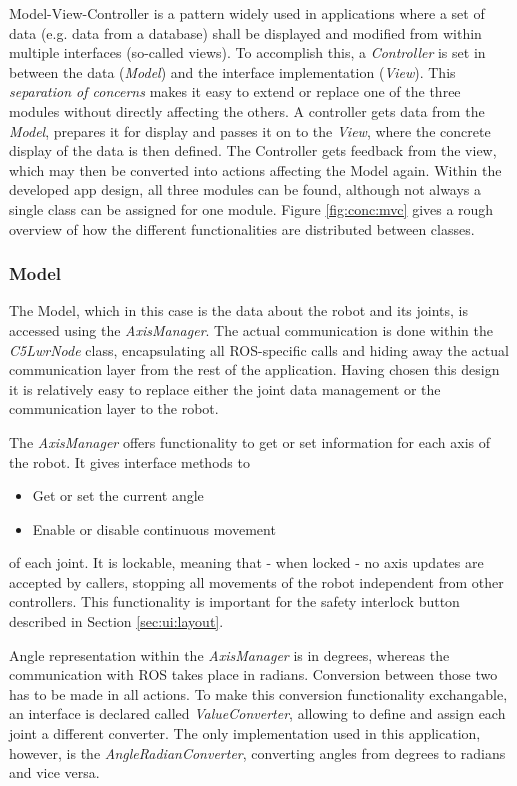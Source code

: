 Model-View-Controller is a pattern widely used in applications where a set of data (e.g. data from a database) shall be displayed and modified from within multiple interfaces (so-called views)\cite{Eilebrecht2013}. To accomplish this, a \textit{Controller} is set in between the data (\textit{Model}) and the interface implementation (\textit{View}). This \textit{separation of concerns} makes it easy to extend or replace one of the three modules without directly affecting the others. A controller gets data from the \textit{Model}, prepares it for display and passes it on to the \textit{View}, where the concrete display of the data is then defined. The Controller gets feedback from the view, which may then be converted into actions affecting the Model again. Within the developed app design, all three modules can be found, although not always a single class can be assigned for one module. Figure \ref{fig:conc:mvc} gives a rough overview of how the different functionalities are distributed between classes.

\subsubsection{Model}

The Model, which in this case is the data about the robot and its joints, is accessed using the \textit{AxisManager}. The actual communication is done within the \textit{C5LwrNode} class, encapsulating all ROS-specific calls and hiding away the actual communication layer from the rest of the application. Having chosen this design it is relatively easy to replace either the joint data management or the communication layer to the robot.

The \textit{AxisManager} offers functionality to get or set information for each axis of the robot. It gives interface methods to
\begin{itemize}
	\item Get or set the current angle
	\item Enable or disable continuous movement
\end{itemize}
of each joint. It is lockable, meaning that - when locked - no axis updates are accepted by callers, stopping all movements of the robot independent from other controllers. This functionality is important for the safety interlock button described in Section \ref{sec:ui:layout}.

Angle representation within the \textit{AxisManager} is in degrees, whereas the communication with ROS takes place in radians. Conversion between those two has to be made in all actions. To make this conversion functionality exchangable, an interface is declared called \textit{ValueConverter}, allowing to define and assign each joint a different converter. The only implementation used in this application, however, is the \textit{AngleRadianConverter}, converting angles from degrees to radians and vice versa.

